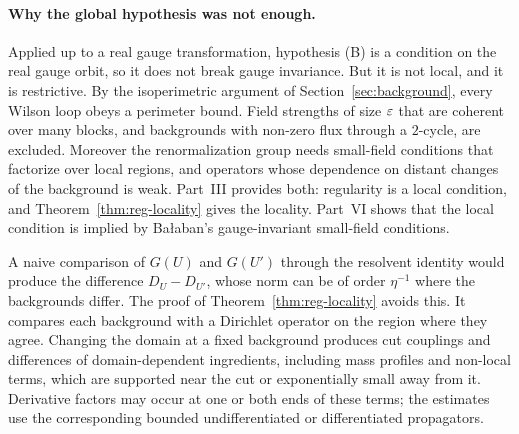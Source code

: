 \paragraph{Why the global hypothesis was not enough.} Applied up to a real gauge transformation, hypothesis (B) is a condition on the real gauge orbit, so it does not break gauge invariance. But it is not local, and it is restrictive. By the isoperimetric argument of Section~\ref{sec:background}, every Wilson loop obeys a perimeter bound. Field strengths of size $\varepsilon$ that are coherent over many blocks, and backgrounds with non-zero flux through a $2$-cycle, are excluded. Moreover the renormalization group needs small-field conditions that factorize over local regions, and operators whose dependence on distant changes of the background is weak. Part~III provides both: regularity is a local condition, and Theorem~\ref{thm:reg-locality} gives the locality. Part~VI shows that the local condition is implied by Ba\l aban's gauge-invariant small-field conditions.

A naive comparison of $G(U)$ and $G(U')$ through the resolvent identity would produce the difference $D_U-D_{U'}$, whose norm can be of order $\eta^{-1}$ where the backgrounds differ. The proof of Theorem~\ref{thm:reg-locality} avoids this. It compares each background with a Dirichlet operator on the region where they agree. Changing the domain at a fixed background produces cut couplings and differences of domain-dependent ingredients, including mass profiles and non-local terms, which are supported near the cut or exponentially small away from it. Derivative factors may occur at one or both ends of these terms; the estimates use the corresponding bounded undifferentiated or differentiated propagators.

